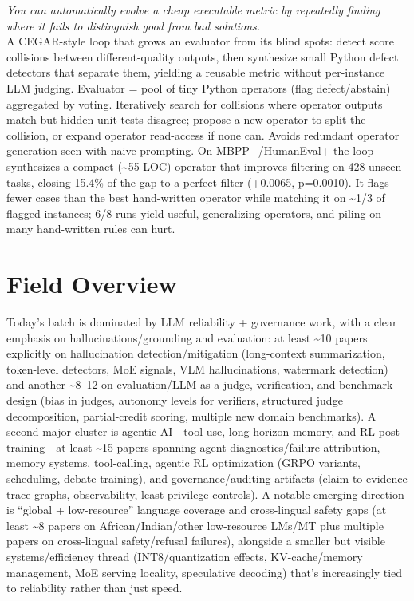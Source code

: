 \documentclass[12pt,letterpaper]{article}
\begin{document}
{\small\textit{You can automatically evolve a cheap executable metric by repeatedly finding where it fails to distinguish good from bad solutions.}}\\[1pt]
{\footnotesize A CEGAR-style loop that grows an evaluator from its blind spots: detect score collisions between different-quality outputs, then synthesize small Python defect detectors that separate them, yielding a reusable metric without per-instance LLM judging. Evaluator = pool of tiny Python operators (flag defect/abstain) aggregated by voting. Iteratively search for collisions where operator outputs match but hidden unit tests disagree; propose a new operator to split the collision, or expand operator read-access if none can. Avoids redundant operator generation seen with naive prompting. On MBPP+/HumanEval+ the loop synthesizes a compact (\textasciitilde{}55 LOC) operator that improves filtering on 428 unseen tasks, closing 15.4\% of the gap to a perfect filter (+0.0065, p=0.0010). It flags fewer cases than the best hand-written operator while matching it on \textasciitilde{}1/3 of flagged instances; 6/8 runs yield useful, generalizing operators, and piling on many hand-written rules can hurt.}

\medskip



\section*{Field Overview}
{\footnotesize Today's batch is dominated by LLM reliability + governance work, with a clear emphasis on hallucinations/grounding and evaluation: at least \textasciitilde{}10 papers explicitly on hallucination detection/mitigation (long-context summarization, token-level detectors, MoE signals, VLM hallucinations, watermark detection) and another \textasciitilde{}8--12 on evaluation/LLM-as-a-judge, verification, and benchmark design (bias in judges, autonomy levels for verifiers, structured judge decomposition, partial-credit scoring, multiple new domain benchmarks). A second major cluster is agentic AI---tool use, long-horizon memory, and RL post-training---at least \textasciitilde{}15 papers spanning agent diagnostics/failure attribution, memory systems, tool-calling, agentic RL optimization (GRPO variants, scheduling, debate training), and governance/auditing artifacts (claim-to-evidence trace graphs, observability, least-privilege controls). A notable emerging direction is ``global + low-resource'' language coverage and cross-lingual safety gaps (at least \textasciitilde{}8 papers on African/Indian/other low-resource LMs/MT plus multiple papers on cross-lingual safety/refusal failures), alongside a smaller but visible systems/efficiency thread (INT8/quantization effects, KV-cache/memory management, MoE serving locality, speculative decoding) that's increasingly tied to reliability rather than just speed.}
\end{document}
